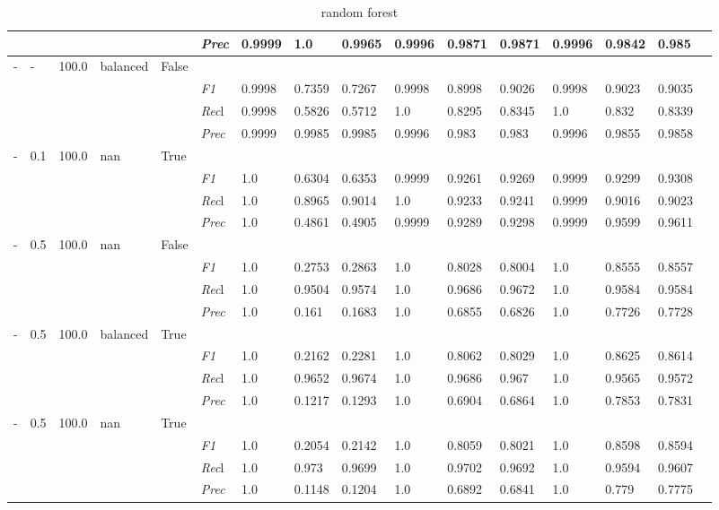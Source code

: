 \begin{table}[]
\begin{tabularx}{\textwidth}{XXXXX|X|XXX|XXX|XXXX}
& & & & & \textit{Prec} & 0.9999 & 1.0 & 0.9965 & 0.9996 & 0.9871 & 0.9871 & 0.9996 & 0.9842 & 0.985 \\ \midrule
- & - & 100.0 & balanced & False& & & & & & & & & \\
& & & & & \textit{F1} & 0.9998 & 0.7359 & 0.7267 & 0.9998 & 0.8998        & 0.9026        & 0.9998        & 0.9023        & 0.9035        \\
& & & & & \textit{Rec}l & 0.9998 & 0.5826 & 0.5712    & 1.0 & 0.8295    & 0.8345    & 1.0    & 0.832    & 0.8339    \\
& & & & & \textit{Prec} & 0.9999 & 0.9985 & 0.9985 & 0.9996 & 0.983 & 0.983 & 0.9996 & 0.9855 & 0.9858 \\ \midrule
- & 0.1 & 100.0 & nan & True& & & & & & & & & \\
& & & & & \textit{F1} & 1.0 & 0.6304 & 0.6353 & 0.9999 & 0.9261        & 0.9269        & 0.9999        & 0.9299        & 0.9308        \\
& & & & & \textit{Rec}l & 1.0 & 0.8965 & 0.9014    & 1.0 & 0.9233    & 0.9241    & 0.9999    & 0.9016    & 0.9023    \\
& & & & & \textit{Prec} & 1.0 & 0.4861 & 0.4905 & 0.9999 & 0.9289 & 0.9298 & 0.9999 & 0.9599 & 0.9611 \\ \midrule
- & 0.5 & 100.0 & nan & False& & & & & & & & & \\
& & & & & \textit{F1} & 1.0 & 0.2753 & 0.2863 & 1.0 & 0.8028        & 0.8004        & 1.0        & 0.8555        & 0.8557        \\
& & & & & \textit{Rec}l & 1.0 & 0.9504 & 0.9574    & 1.0 & 0.9686    & 0.9672    & 1.0    & 0.9584    & 0.9584    \\
& & & & & \textit{Prec} & 1.0 & 0.161 & 0.1683 & 1.0 & 0.6855 & 0.6826 & 1.0 & 0.7726 & 0.7728 \\ \midrule
- & 0.5 & 100.0 & balanced & True& & & & & & & & & \\
& & & & & \textit{F1} & 1.0 & 0.2162 & 0.2281 & 1.0 & 0.8062        & 0.8029        & 1.0        & 0.8625        & 0.8614        \\
& & & & & \textit{Rec}l & 1.0 & 0.9652 & 0.9674    & 1.0 & 0.9686    & 0.967    & 1.0    & 0.9565    & 0.9572    \\
& & & & & \textit{Prec} & 1.0 & 0.1217 & 0.1293 & 1.0 & 0.6904 & 0.6864 & 1.0 & 0.7853 & 0.7831 \\ \midrule
- & 0.5 & 100.0 & nan & True& & & & & & & & & \\
& & & & & \textit{F1} & 1.0 & 0.2054 & 0.2142 & 1.0 & 0.8059        & 0.8021        & 1.0        & 0.8598        & 0.8594        \\
& & & & & \textit{Rec}l & 1.0 & 0.973 & 0.9699    & 1.0 & 0.9702    & 0.9692    & 1.0    & 0.9594    & 0.9607    \\
& & & & & \textit{Prec} & 1.0 & 0.1148 & 0.1204 & 1.0 & 0.6892 & 0.6841 & 1.0 & 0.779 & 0.7775 \\ \midrule
\end{tabularx}
\caption{random forest}
\label{tab:all_results_random_forest}
\end{table}

